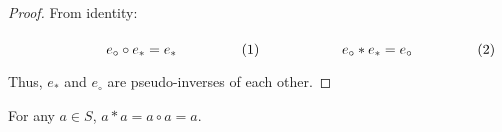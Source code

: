             \begin{proof}
                From identity:
                \par\hfill\par
                \begin{subequations}
                    \begin{minipage}[b]{0.49\textwidth}
                        \begin{equation}
                            e_{\circ}\circ{e}_{*}=e_{*}
                        \end{equation}
                    \end{minipage}
                    \hfill
                    \begin{minipage}[b]{0.49\textwidth}
                        \begin{equation}
                            e_{\circ}*{e}_{*}=e_{\circ}
                        \end{equation}
                    \end{minipage}
                \end{subequations}
                \par\vspace{2.5ex}
                Thus, $e_{*}$ and $e_{\circ}$ are pseudo-inverses of each other.
            \end{proof}
            \begin{theorem}
                \label{thm:Pseudo_Field_Elements_are_Idempotent}%
                For any $a\in{S}$, $a*a=a\circ{a}=a$.
            \end{theorem}
